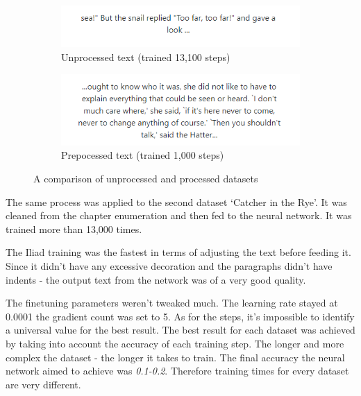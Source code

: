 \documentclass[12pt]{report}
\begin{document}
\begin{figure}[ht]
  \captionsetup[subfigure]{labelformat=empty}
  \centering
  \begin{subfigure}{.5\textwidth}
    \centering
    \includegraphics[width=1\linewidth]{img/alice-original.png}
    \caption{Unprocessed text (trained 13,100 steps)}
    \label{fig:unprocess-alice}
  \end{subfigure}%
  \begin{subfigure}{.5\textwidth}
    \centering
    \includegraphics[width=1\linewidth]{img/alice-preprocess.png}
    \caption{Prepocessed text (trained 1,000 steps)}
    \label{fig:preprocess-alice}
  \end{subfigure}
  \caption{A comparison of unprocessed and processed datasets}
  \label{fig:comparison_process_unprocess}
\end{figure}

The same process was applied to the second dataset `Catcher in the Rye'. It was cleaned from the chapter enumeration and
then fed to the neural network. It was trained more than 13,000 times.

The Iliad training was the fastest in terms of adjusting the text before feeding it. Since it didn't have any excessive
decoration and the paragraphs didn't have indents - the output text from the network was of a very good quality.

The finetuning parameters weren't tweaked much. The learning rate stayed at 0.0001 the gradient count was set to
5. As for the steps, it's impossible to identify a universal value for the best result. The best result for each
dataset was achieved by taking into account the accuracy of each training step. The longer and more complex the dataset -
the longer it takes to train. The final accuracy the neural network aimed to achieve was \textit{0.1-0.2}. Therefore
training times for every dataset are very different.
\end{document}

